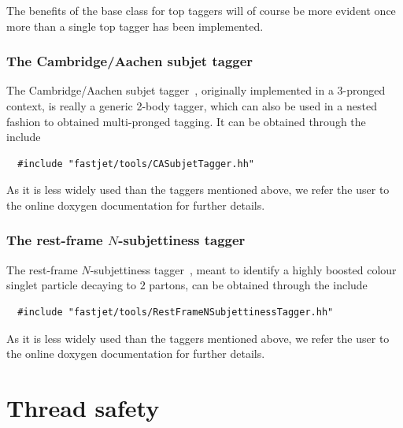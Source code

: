 \documentclass[12pt,a4]{article}
\begin{document}
The benefits of the base class for top taggers will of course be more
evident once more than a single top tagger has been implemented.

\subsubsection{The Cambridge/Aachen subjet tagger}

The Cambridge/Aachen subjet
tagger~\cite{Butterworth:2009qa}, originally implemented in a
3-pronged context, is really a generic 2-body tagger, which can also be
used in a nested fashion to obtained multi-pronged tagging.
%
It can be obtained through the include
\begin{lstlisting}
  #include "fastjet/tools/CASubjetTagger.hh"
\end{lstlisting}
As it is less widely used than the taggers mentioned above, we refer
the user to the online doxygen documentation for further details.


\subsubsection{The rest-frame $N$-subjettiness tagger}

The rest-frame $N$-subjettiness
tagger~\cite{nsubtagger}, meant to identify a highly boosted colour
singlet particle decaying to $2$ partons, can be obtained through the include
\begin{lstlisting}
  #include "fastjet/tools/RestFrameNSubjettinessTagger.hh"
\end{lstlisting}
As it is less widely used than the taggers mentioned above, we refer
the user to the online doxygen documentation for further details.



\section{Thread safety}
\label{sec:thread-safety}
\end{document}
